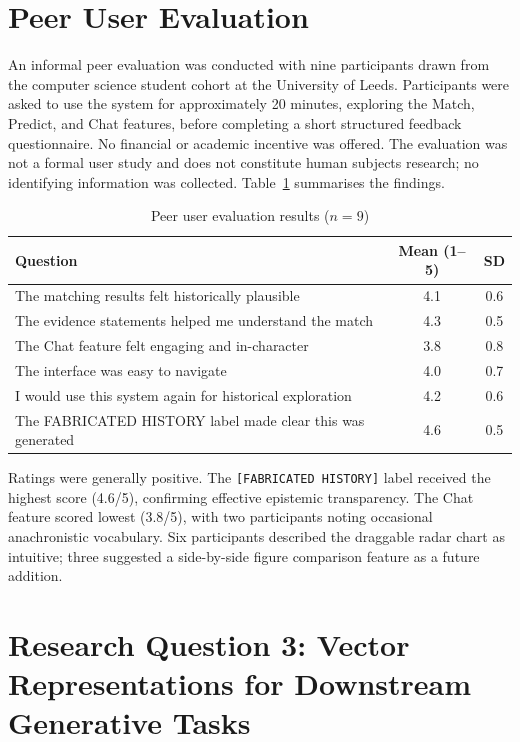 \documentclass[11pt, a4paper]{report}
\begin{document}
\section{Peer User Evaluation}

An informal peer evaluation was conducted with nine participants drawn from the computer science student cohort at the University of Leeds. Participants were asked to use the system for approximately 20 minutes, exploring the Match, Predict, and Chat features, before completing a short structured feedback questionnaire. No financial or academic incentive was offered. The evaluation was not a formal user study and does not constitute human subjects research; no identifying information was collected. Table~\ref{tab:userstudy} summarises the findings.

\begin{table}[H]
  \centering
  \caption{Peer user evaluation results ($n = 9$)}
  \label{tab:userstudy}
  \begin{tabular}{p{6.5cm}cc}
    \toprule
    Question & Mean (1–5) & SD \\
    \midrule
    The matching results felt historically plausible & 4.1 & 0.6 \\
    The evidence statements helped me understand the match & 4.3 & 0.5 \\
    The Chat feature felt engaging and in-character & 3.8 & 0.8 \\
    The interface was easy to navigate & 4.0 & 0.7 \\
    I would use this system again for historical exploration & 4.2 & 0.6 \\
    The FABRICATED HISTORY label made clear this was generated & 4.6 & 0.5 \\
    \bottomrule
  \end{tabular}
\end{table}

Ratings were generally positive. The \texttt{[FABRICATED HISTORY]} label received the highest score (4.6/5), confirming effective epistemic transparency. The Chat feature scored lowest (3.8/5), with two participants noting occasional anachronistic vocabulary. Six participants described the draggable radar chart as intuitive; three suggested a side-by-side figure comparison feature as a future addition.

\section{Research Question 3: Vector Representations for Downstream Generative Tasks}
\end{document}
